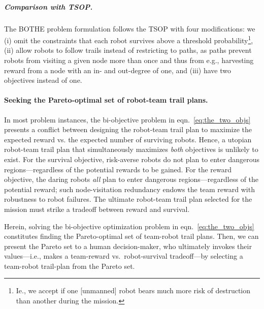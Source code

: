 \documentclass[11pt, oneside]{article}
\begin{document}
\subparagraph{Comparison with TSOP.}
The BOTHE problem formulation follows the TSOP \cite{jorgensen2018team} with four modifications: we 
(i) omit the constraints that each robot survives above a threshold probability\footnote{Ie., we accept if one [unmanned] robot bears much more risk of destruction than another during the mission.},
(ii) allow robots to follow trails instead of restricting to paths, as paths prevent robots from visiting a given node more than once and thus from e.g., harvesting reward from a node with an in- and out-degree of one, 
and
(iii) have two objectives instead of one.

\paragraph{Seeking the Pareto-optimal set of robot-team trail plans.} 
In most problem instances, the bi-objective problem in eqn.~\ref{eq:the_two_objs} presents a conflict between designing the robot-team trail plan to maximize the expected reward vs. the expected number of surviving robots. Hence, a utopian robot-team trail plan that simultaneously maximizes \emph{both} objectives is unlikely to exist.
For the survival objective, risk-averse robots do not plan to enter dangerous regions---regardless of the potential rewards to be gained.
For the reward objective, the daring robots \emph{all} plan to enter dangerous regions---regardless of the potential reward; such node-visitation redundancy endows the team reward with robustness to robot failures. The ultimate robot-team trail plan selected for the mission must strike a tradeoff between reward and survival.


Herein, solving the bi-objective optimization problem in eqn.~\ref{eq:the_two_objs} constitutes finding the Pareto-optimal set of team-robot trail plans. Then, we can present the Pareto set to a human decision-maker, who ultimately invokes their values---i.e., makes a team-reward vs.\  robot-survival tradeoff---by selecting a team-robot trail-plan from the Pareto set.
\end{document}
